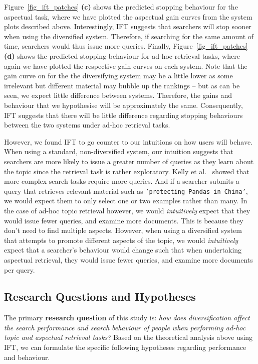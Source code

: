 Figure~\ref{fig_ift_patches} \textbf{(c)} shows the predicted stopping behaviour for the aspectual task, where we have plotted the aspectual gain curves from the system plots described above. Interestingly, IFT suggests that searchers will stop sooner when using the diversified system. Therefore, if searching for the same amount of time, searchers would thus issue more queries. Finally, Figure~\ref{fig_ift_patches} \textbf{(d)} shows the predicted stopping behaviour for ad-hoc retrieval tasks, where again we have plotted the respective gain curves on each system. Note that the gain curve on for the the diversifying system may be a little lower as some irrelevant but different material may bubble up the rankings -- but as can be seen, we expect little difference between systems. Therefore, the gains and behaviour that we hypothesise will be approximately the same. Consequently, IFT suggests that there will be little difference regarding stopping behaviours between the two systems under ad-hoc retrieval tasks.

However, we found IFT to go counter to our intuitions on how users will behave. When using a standard, non-diversified system, our intuition suggests that searchers are more likely to issue a greater number of queries as they learn about the topic since the retrieval task is rather exploratory. Kelly et al.~\cite{kelly2015search_tasks} showed that more complex search tasks require more queries. And if a searcher submits a query that retrieves relevant material such as \texttt{'protecting Pandas in China'}, we would expect them to only select one or two examples rather than many. In the case of ad-hoc topic retrieval however, we would \emph{intuitively} expect that they would issue fewer queries, and examine more documents. This is because they don't need to find multiple aspects. However, when using a diversified system that attempts to promote different aspects of the topic, we would \emph{intuitively} expect that a searcher's behaviour would change such that when undertaking aspectual retrieval, they would issue fewer queries, and examine more documents per query. 

\subsection{Research Questions and Hypotheses} \label{sec:questions}
The primary \textbf{research question} of this study is: {\it how does diversification affect the search performance and search behaviour of people when performing ad-hoc topic and aspectual retrieval tasks?} Based on the theoretical analysis above using IFT, we can formulate the specific following hypotheses regarding performance and behaviour.

